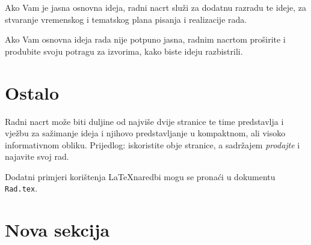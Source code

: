 \documentclass{llncs}
\begin{document}
	Ako Vam je jasna osnovna ideja, radni nacrt služi za dodatnu razradu te ideje, za stvaranje vremenskog i tematskog plana pisanja i realizacije rada.
	
	Ako Vam osnovna ideja rada nije potpuno jasna, radnim nacrtom proširite i produbite svoju potragu za izvorima, kako biste ideju razbistrili.
	
	\section{Ostalo}
	
	Radni nacrt može biti duljine od najviše dvije stranice te time predstavlja i vježbu za sažimanje ideja i njihovo predstavljanje u kompaktnom, ali visoko informativnom obliku. Prijedlog: iskoristite obje stranice, a sadržajem \textit{prodajte} i najavite svoj rad.
	
	Dodatni primjeri korištenja \LaTeX naredbi mogu se pronaći u dokumentu \lstinline+Rad.tex+.
	
	\section{Nova sekcija}
	
	\lipsum[1-2]

	\printbibliography
\end{document}
